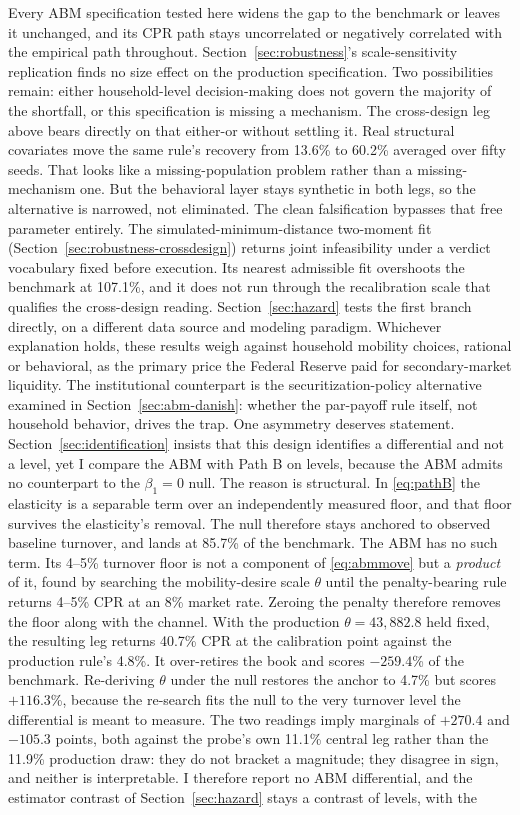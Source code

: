 \documentclass[12pt]{article}
\begin{document}
Every ABM specification tested here widens the gap to the benchmark or leaves it unchanged, and its CPR path stays uncorrelated or negatively correlated with the empirical path throughout. Section~\ref{sec:robustness}'s scale-sensitivity replication finds no size effect on the production specification. Two possibilities remain: either household-level decision-making does not govern the majority of the shortfall, or this specification is missing a mechanism. The cross-design leg above bears directly on that either-or without settling it. Real structural covariates move the same rule's recovery from 13.6\% to 60.2\% averaged over fifty seeds. That looks like a missing-population problem rather than a missing-mechanism one. But the behavioral layer stays synthetic in both legs, so the alternative is narrowed, not eliminated. The clean falsification bypasses that free parameter entirely. The simulated-minimum-distance two-moment fit (Section~\ref{sec:robustness-crossdesign}) returns joint infeasibility under a verdict vocabulary fixed before execution. Its nearest admissible fit overshoots the benchmark at 107.1\%, and it does not run through the recalibration scale that qualifies the cross-design reading. Section~\ref{sec:hazard} tests the first branch directly, on a different data source and modeling paradigm. Whichever explanation holds, these results weigh against household mobility choices, rational or behavioral, as the primary price the Federal Reserve paid for secondary-market liquidity. The institutional counterpart is the securitization-policy alternative examined in Section~\ref{sec:abm-danish}: whether the par-payoff rule itself, not household behavior, drives the trap. One asymmetry deserves statement. Section~\ref{sec:identification} insists that this design identifies a differential and not a level, yet I compare the ABM with Path B on levels, because the ABM admits no counterpart to the $\beta_1 = 0$ null. The reason is structural. In \eqref{eq:pathB} the elasticity is a separable term over an independently measured floor, and that floor survives the elasticity's removal. The null therefore stays anchored to observed baseline turnover, and lands at 85.7\% of the benchmark. The ABM has no such term. Its 4--5\% turnover floor is not a component of \eqref{eq:abmmove} but a \emph{product} of it, found by searching the mobility-desire scale $\theta$ until the penalty-bearing rule returns 4--5\% CPR at an 8\% market rate. Zeroing the penalty therefore removes the floor along with the channel. With the production $\theta = 43{,}882.8$ held fixed, the resulting leg returns 40.7\% CPR at the calibration point against the production rule's 4.8\%. It over-retires the book and scores $-259.4$\% of the benchmark. Re-deriving $\theta$ under the null restores the anchor to 4.7\% but scores $+116.3$\%, because the re-search fits the null to the very turnover level the differential is meant to measure. The two readings imply marginals of $+270.4$ and $-105.3$ points, both against the probe's own 11.1\% central leg rather than the 11.9\% production draw: they do not bracket a magnitude; they disagree in sign, and neither is interpretable. I therefore report no ABM differential, and the estimator contrast of Section~\ref{sec:hazard} stays a contrast of levels, with the 
\end{document}

